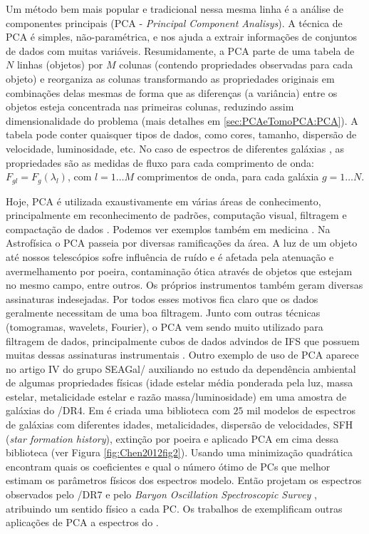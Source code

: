 Um método bem mais popular e tradicional nessa mesma linha é a análise de componentes principais (PCA - {\em Principal
Component Analisys}). A técnica de PCA é simples, não-paramétrica, e nos ajuda a extrair informações de conjuntos de
dados com muitas variáveis. Resumidamente, a PCA parte de uma tabela de $N$ linhas (objetos) por $M$ colunas (contendo
propriedades observadas para cada objeto) e reorganiza as colunas transformando as propriedades originais em combinações
delas mesmas de forma que as diferenças (a variância) entre os objetos  esteja concentrada nas primeiras colunas,
reduzindo assim dimensionalidade do problema (mais detalhes em \ref{sec:PCAeTomoPCA:PCA}). A tabela pode conter
quaisquer tipos de dados, como cores, tamanho, dispersão de velocidade, luminosidade, etc. No caso de espectros de
diferentes galáxias \citep[e.g., ][]{Francis1992, Sodre1994, Sodre1997}, as propriedades são as medidas de fluxo para
cada comprimento de onda: $F_{gl} = F_g(\lambda_l)$, com $l = 1 \ldots M$ comprimentos de onda, para cada galáxia $g = 1
\ldots N$.

Hoje, PCA é utilizada exaustivamente em várias áreas de conhecimento, principalmente em reconhecimento de padrões,
computação visual, filtragem e compactação de dados \citep{Kamruzzaman2010, Borcea2012}. Podemos ver exemplos também em
medicina \citep{Balakrishnan2013}. Na Astrofísica o PCA passeia por diversas ramificações da área. A luz de um objeto
até nossos telescópios sofre influência de ruído e é afetada pela atenuação e avermelhamento por poeira, contaminação
ótica através de objetos que estejam no mesmo campo, entre outros. Os próprios instrumentos também geram diversas
assinaturas indesejadas. Por todos esses motivos fica claro que os dados geralmente necessitam de uma boa filtragem.
Junto com outras técnicas (tomogramas, wavelets, Fourier), o PCA vem sendo muito utilizado para filtragem de dados,
principalmente cubos de dados advindos de IFS que possuem muitas dessas assinaturas instrumentais \citep{Riffel2011}.
Outro exemplo de uso de PCA aparece no artigo IV do grupo SEAGal/\starlight \citep{Mateus2007} auxiliando no estudo da
dependência ambiental de algumas propriedades físicas (idade estelar média ponderada pela luz, massa estelar,
metalicidade estelar e razão massa/luminosidade) em uma amostra de galáxias do \SDSS/DR4. Em \citet{Chen2012} é criada
uma biblioteca com $25$ mil modelos de espectros de galáxias com diferentes idades, metalicidades, dispersão de
velocidades, SFH ({\em star formation history}), extinção por poeira e aplicado PCA em cima dessa biblioteca (ver Figura
\ref{fig:Chen2012fig2}). Usando uma minimização quadrática encontram quais os coeficientes e qual o número ótimo de PCs
que melhor estimam os parâmetros físicos dos espectros modelo. Então projetam os espectros observados pelo \SDSS/DR7
\citep{Abazajian2009} e pelo {\em Baryon Oscillation Spectroscopic Survey} \citep[BOSS;][]{Ahn2012}, atribuindo um
sentido físico a cada PC. Os trabalhos de \citet{Ferreras2006, Wild2006, Rogers2007} exemplificam outras aplicações de
PCA a espectros do \SDSS.

